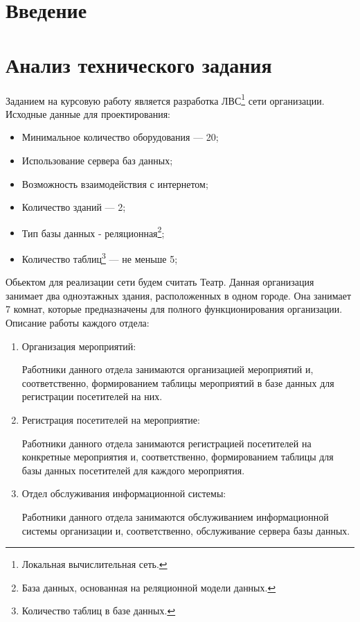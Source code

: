 \documentclass[russian,utf8,pointsection,simple,14pt]{eskdtext}
\begin{document}
	
	\maketitle
	\maketitle
	\maketitle
	\newpage
	\tableofcontents
	
	\newpage
	\section{Введение}
	\newpage
	
	\section{Анализ технического задания}
	Заданием на курсовую работу является разработка ЛВС\footnote{Локальная вычислительная сеть.} сети организации.
	\medskip
	\point Исходные данные для проектирования:
	\begin{itemize}
		\item Минимальное количество оборудования --- 20;
		\item Использование сервера баз данных;
		\item Возможность взаимодействия с интернетом;
		\item Количество зданий --- 2;
		\item Тип базы данных - реляционная\footnote{База данных, основанная на реляционной модели данных.};
		\item Количество таблиц\footnote{Количество таблиц в базе данных.} --- не меньше 5;
	\end{itemize}
	
	Обьектом для реализации сети будем считать Театр. Данная организация занимает два одноэтажных здания, расположенных в одном городе. Она занимает 7 комнат, которые предназначены для полного функционирования организации.
	\medskip 
	\point Описание работы каждого отдела:
	\begin{enumerate}
		\item Организация мероприятий:
		
		Работники данного отдела занимаются организацией мероприятий и, соответственно, формированием таблицы мероприятий в базе данных для регистрации посетителей на них. 
		
		\item Регистрация посетителей на мероприятие:
		
		Работники данного отдела занимаются регистрацией посетителей на конкретные мероприятия и, соответственно, формированием таблицы для базы данных посетителей для каждого мероприятия.
		
		\item Отдел обслуживания информационной системы:
		
		Работники данного отдела занимаются обслуживанием информационной системы организации и, соответственно, обслуживание сервера базы данных.
		
	\end{enumerate}
	
\end{document}
